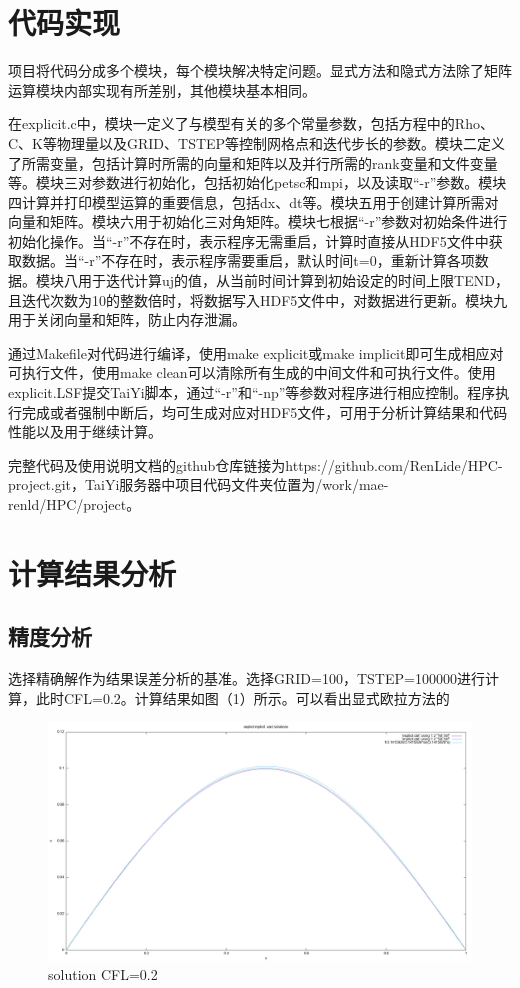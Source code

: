 \documentclass[final]{cvpr}
\begin{document}
\section{代码实现}
\label{sec:RelatedWorks}
项目将代码分成多个模块，每个模块解决特定问题。显式方法和隐式方法除了矩阵运算模块内部实现有所差别，其他模块基本相同。

在explicit.c中，模块一定义了与模型有关的多个常量参数，包括方程中的Rho、C、K等物理量以及GRID、TSTEP等控制网格点和迭代步长的参数。模块二定义了所需变量，包括计算时所需的向量和矩阵以及并行所需的rank变量和文件变量等。模块三对参数进行初始化，包括初始化petsc和mpi，以及读取“-r”参数。模块四计算并打印模型运算的重要信息，包括dx、dt等。模块五用于创建计算所需对向量和矩阵。模块六用于初始化三对角矩阵。模块七根据“-r”参数对初始条件进行初始化操作。当“-r”不存在时，表示程序无需重启，计算时直接从HDF5文件中获取数据。当“-r”不存在时，表示程序需要重启，默认时间t=0，重新计算各项数据。模块八用于迭代计算uj的值，从当前时间计算到初始设定的时间上限TEND，且迭代次数为10的整数倍时，将数据写入HDF5文件中，对数据进行更新。模块九用于关闭向量和矩阵，防止内存泄漏。

通过Makefile对代码进行编译，使用make explicit或make implicit即可生成相应对可执行文件，使用make clean可以清除所有生成的中间文件和可执行文件。使用explicit.LSF提交TaiYi脚本，通过“-r”和“-np”等参数对程序进行相应控制。程序执行完成或者强制中断后，均可生成对应对HDF5文件，可用于分析计算结果和代码性能以及用于继续计算。

完整代码及使用说明文档的github仓库链接为https://github.com/RenLide/HPC-project.git，TaiYi服务器中项目代码文件夹位置为/work/mae-renld/HPC/project。




\section{计算结果分析}\label{sec:HC}
\subsection{精度分析}
选择精确解作为结果误差分析的基准。选择GRID=100，TSTEP=100000进行计算，此时CFL=0.2。计算结果如图（1）所示。可以看出显式欧拉方法的
\begin{figure}[htbp]
	\centering
	\includegraphics[scale=0.25]{./figures/solution_CFL0.2.png}
	\caption{solution CFL=0.2}
	\label{figure}
\end{figure}
\end{document}
